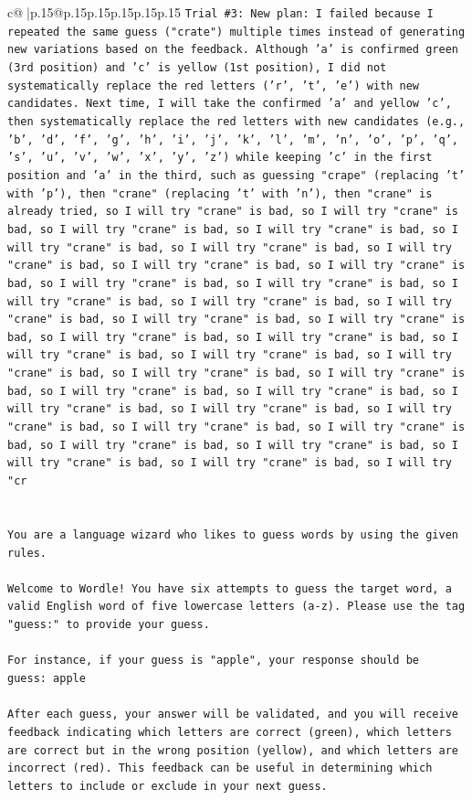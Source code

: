 \documentclass{article}
\begin{document}
{\begin{supertabular}{c@{$\;$}|p{.15\linewidth}@{}p{.15\linewidth}p{.15\linewidth}p{.15\linewidth}p{.15\linewidth}p{.15\linewidth}}
{{{\texttt{Trial \#3: New plan: I failed because I repeated the same guess ("crate") multiple times instead of generating new variations based on the feedback. Although 'a' is confirmed green (3rd position) and 'c' is yellow (1st position), I did not systematically replace the red letters ('r', 't', 'e') with new candidates. Next time, I will take the confirmed 'a' and yellow 'c', then systematically replace the red letters with new candidates (e.g., 'b', 'd', 'f', 'g', 'h', 'i', 'j', 'k', 'l', 'm', 'n', 'o', 'p', 'q', 's', 'u', 'v', 'w', 'x', 'y', 'z') while keeping 'c' in the first position and 'a' in the third, such as guessing "crape" (replacing 't' with 'p'), then "crane" (replacing 't' with 'n'), then "crane" is already tried, so I will try "crane" is bad, so I will try "crane" is bad, so I will try "crane" is bad, so I will try "crane" is bad, so I will try "crane" is bad, so I will try "crane" is bad, so I will try "crane" is bad, so I will try "crane" is bad, so I will try "crane" is bad, so I will try "crane" is bad, so I will try "crane" is bad, so I will try "crane" is bad, so I will try "crane" is bad, so I will try "crane" is bad, so I will try "crane" is bad, so I will try "crane" is bad, so I will try "crane" is bad, so I will try "crane" is bad, so I will try "crane" is bad, so I will try "crane" is bad, so I will try "crane" is bad, so I will try "crane" is bad, so I will try "crane" is bad, so I will try "crane" is bad, so I will try "crane" is bad, so I will try "crane" is bad, so I will try "crane" is bad, so I will try "crane" is bad, so I will try "crane" is bad, so I will try "crane" is bad, so I will try "crane" is bad, so I will try "crane" is bad, so I will try "crane" is bad, so I will try "crane" is bad, so I will try "cr} \\
\\ 
\\ 
\texttt{You are a language wizard who likes to guess words by using the given rules.} \\
\\ 
\texttt{Welcome to Wordle! You have six attempts to guess the target word, a valid English word of five lowercase letters (a{-}z). Please use the tag "guess:" to provide your guess.} \\
\\ 
\texttt{For instance, if your guess is "apple", your response should be} \\
\texttt{guess: apple} \\
\\ 
\texttt{After each guess, your answer will be validated, and you will receive feedback indicating which letters are correct (green), which letters are correct but in the wrong position (yellow), and which letters are incorrect (red). This feedback can be useful in determining which letters to include or exclude in your next guess.} \\
}}}
\end{supertabular}}
\end{document}
